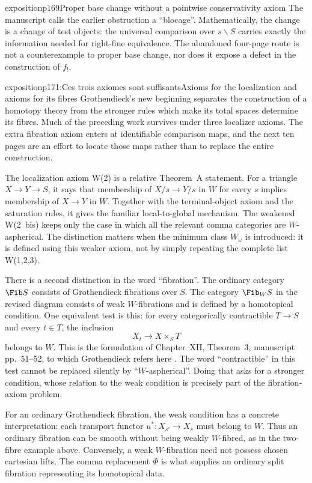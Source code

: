 \begin{dcomment}{exposition}{p169}{Proper base change without a pointwise conservativity axiom}
The manuscript calls the earlier obstruction a ``blocage''. Mathematically, the change is a change of test objects: the universal comparison over $s\backslash S$ carries exactly the information needed for right-fine equivalence. The abandoned four-page route is not a counterexample to proper base change, nor does it expose a defect in the construction of $f_!$.
\end{dcomment}

\begin{dcomment}{exposition}{p171:Ces trois axiomes sont suffisants}{Axioms for the localization and axioms for its fibres}
Grothendieck's new beginning separates the construction of a homotopy theory from the stronger rules which make its total spaces determine its fibres. Much of the preceding work survives under three localizer axioms. The extra fibration axiom enters at identifiable comparison maps, and the next ten pages are an effort to locate those maps rather than to replace the entire construction.

The localization axiom W(2) is a relative Theorem~A statement. For a triangle $X\to Y\to S$, it says that membership of $X/s\to Y/s$ in $W$ for every $s$ implies membership of $X\to Y$ in $W$. Together with the terminal-object axiom and the saturation rules, it gives the familiar local-to-global mechanism. The weakened W(2~bis) keeps only the case in which all the relevant comma categories are $W$-aspherical. The distinction matters when the minimum class $W_\omega$ is introduced: it is defined using this weaker axiom, not by simply repeating the complete list W(1,2,3).

There is a second distinction in the word ``fibration''. The ordinary category $\Fib S$ consists of Grothendieck fibrations over $S$. The category $\Fib_W S$ in the revised diagram consists of weak $W$-fibrations and is defined by a homotopical condition. One equivalent test is this: for every categorically contractible $T\to S$ and every $t\in T$, the inclusion
\[
 X_t\longrightarrow X\times_ST
\]
belongs to $W$. This is the formulation of Chapter~XII, Theorem~3, manuscript pp.~51--52, to which Grothendieck refers here \citep{Grothendieck1990XIIa}. The word ``contractible'' in this test cannot be replaced silently by ``$W$-aspherical''. Doing that asks for a stronger condition, whose relation to the weak condition is precisely part of the fibration-axiom problem.

For an ordinary Grothendieck fibration, the weak condition has a concrete interpretation: each transport functor $u^*:X_{s'}\to X_s$ must belong to $W$. Thus an ordinary fibration can be smooth without being weakly $W$-fibred, as in the two-fibre example above. Conversely, a weak $W$-fibration need not possess chosen cartesian lifts. The comma replacement $\Phi$ is what supplies an ordinary split fibration representing its homotopical data.


\end{dcomment}
